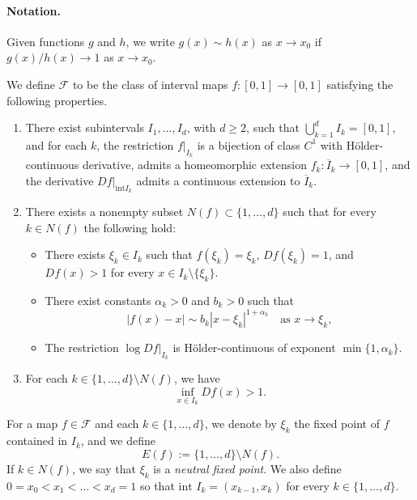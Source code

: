 \documentclass[10pt,a4paper]{amsart}
\numberwithin{equation}{section} %
\numberwithin{figure}{section} %
\newcommand{\sF}{\mathscr{F}}
\renewcommand{\=}{\coloneqq}
\begin{document}
\paragraph{\textbf{Notation.}} Given functions $g$ and $h$, we write $g(x)\sim h(x)$ as $x\to x_0$ if $g(x)/h(x)\to 1$ as $x\to x_0$.

We define $\sF$ to be the class of interval maps $f\colon[0,1]\to[0,1]$ satisfying the following properties.

\begin{enumerate}[label=\textbf{P\arabic*.}, ref=P\arabic*]
\item\label{itm P1} There exist subintervals $I_1,\ldots,I_d$, with $d\geq 2$, such that $\bigcup_{k=1}^d I_k = [0,1]$, and for each $k$, the restriction $f|_{I_k}$ is a bijection of class $C^1$ with Hölder-continuous derivative, admits a homeomorphic extension $f_k\colon \overline{I}_k \to [0,1]$, and the derivative $Df|_{\text{int}I_k}$ admits a continuous extension to $\overline{I}_k$.

\item\label{itm P2} There exists a nonempty subset $N(f)\subset \{1,\ldots,d\}$ such that for every $k\in N(f)$ the following hold:
\begin{itemize}
\item[(1)] There exists $\xi_k\in I_k$ such that $f(\xi_k)=\xi_k$, $Df(\xi_k)=1$, and $Df(x)>1$ for every $x\in I_k\setminus\{\xi_k\}$.

\item[(2)] There exist constants $\alpha_k>0$ and $b_k>0$ such that
\begin{equation}
|f(x)-x| \sim b_k |x-\xi_k|^{1+\alpha_k} \quad \text{as } x\to\xi_k,
\end{equation}
\item[(3)] The restriction $\log Df|_{I_k}$ is Hölder-continuous of exponent $\min\{1,\alpha_k\}$.
\end{itemize}

\item\label{itm P3} For each $k\in \{1,\ldots,d\}\setminus N(f)$, we have 
$$
\inf_{x\in I_k}Df(x)>1.
$$
\end{enumerate}

For a map $f\in \mathscr{F}$ and each $k\in \{1,\ldots,d\}$, we denote by $\xi_k$ the fixed point of $f$ contained in $I_k$, and we define
\[
E(f) := \{1,\ldots,d\}\setminus N(f).
\]
If $k\in N(f)$, we say that $\xi_k$ is a \emph{neutral fixed point}.
We also define $0= x_0 <x_1<\dots<x_d=1$  so that $\text{int } I_k =(x_{k-1},x_k)$ for every $k\in\{1,\dots,d\}$.
\end{document}
